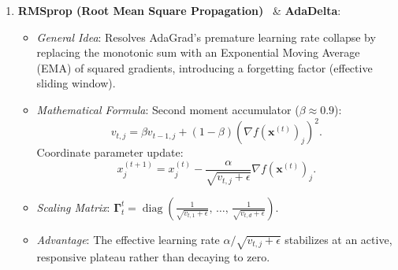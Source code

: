 \begin{enumerate}
  \item \textbf{RMSprop (Root Mean Square Propagation)}~\cite{goodfellow2016deep} \& \textbf{AdaDelta}:
    \begin{itemize}[noitemsep]
      \item \textit{General Idea}: Resolves AdaGrad's premature learning rate collapse by replacing the monotonic sum with an Exponential Moving Average (EMA) of squared gradients, introducing a forgetting factor (effective sliding window).
      \item \textit{Mathematical Formula}:
        Second moment accumulator ($\beta \approx 0.9$):
        \begin{equation}
        v_{t, j} = \beta v_{t-1, j} + (1 - \beta) \left( \nabla f(\mathbf{x}^{(t)})_j \right)^2.
        \end{equation}
        Coordinate parameter update:
        \begin{equation}
        x_j^{(t+1)} = x_j^{(t)} - \frac{\alpha}{\sqrt{v_{t, j} + \epsilon}} \nabla f(\mathbf{x}^{(t)})_j.
        \end{equation}
      \item \textit{Scaling Matrix}: $\boldsymbol{\Gamma}_t^t = \operatorname{diag}\left( \frac{1}{\sqrt{v_{t, 1} + \epsilon}}, \, \dots, \, \frac{1}{\sqrt{v_{t, d} + \epsilon}} \right)$.
      \item \textit{Advantage}: The effective learning rate $\alpha / \sqrt{v_{t, j} + \epsilon}$ stabilizes at an active, responsive plateau rather than decaying to zero.
    \end{itemize}


\end{enumerate}
